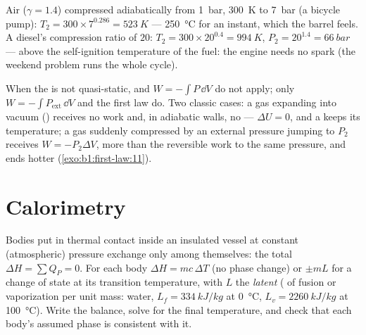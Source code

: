 \begin{example}\label{ex:b1:first-law:diesel}
Air ($\gamma = 1.4$) compressed adiabatically from \qty{1}{bar}, \qty{300}{K}
to \qty{7}{bar} (a bicycle pump): $T_2 = 300 \times 7^{0.286} = \qty{523}{K}$
--- \qty{250}{\degreeCelsius} for an instant, which the barrel feels. A
diesel's compression ratio of $20$: $T_2 = 300 \times 20^{0.4} = \qty{994}{K}$,
$P_2 = 20^{1.4} = \qty{66}{bar}$ --- above the self-ignition temperature of
the fuel: the engine needs no spark (the weekend problem runs the
whole cycle).
\end{example}

\begin{remark}\label{rem:b1:first-law:irreversible}
When the  is not quasi-static,  and $W =
-\int P\,\dd V$ do not apply; only $W = -\int P_{\mathrm{ext}}\,\dd V$ and the
first law do. Two classic cases: a gas expanding into vacuum () receives no work and, in adiabatic walls, no  --- $\Delta U
= 0$, and a  keeps its temperature; a gas suddenly compressed
by an external pressure jumping to $P_2$ receives $W = -P_2\Delta V$, more
than the reversible work to the same pressure, and ends hotter
(\cref{exo:b1:first-law:11}).
\end{remark}

\section{Calorimetry}

\begin{method}\label{met:b1:first-law:calorimetry}
Bodies put in thermal contact inside an insulated vessel at constant
(atmospheric) pressure exchange  only among themselves: the total
$\Delta H = \sum Q_P = 0$. For each body $\Delta H = mc\,\Delta T$ (no phase
change) or $\pm mL$ for a change of state at its transition temperature,
with $L$ the \emph{latent } ( of fusion or vaporization per
unit mass: water, $L_f = \qty{334}{kJ/kg}$ at \qty{0}{\degreeCelsius}, $L_v =
\qty{2260}{kJ/kg}$ at \qty{100}{\degreeCelsius}). Write the balance, solve
for the final temperature, and check that each body's assumed phase is
consistent with it.
\end{method}

